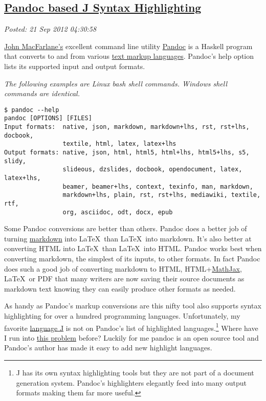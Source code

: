 %

\subsection*{\href{https://bakerjd99.wordpress.com/2012/09/20/pandoc-based-j-syntax-highlighting/}{Pandoc based J Syntax Highlighting}}

\noindent\emph{Posted: 21 Sep 2012 04:30:58}
\vspace{6pt}

\href{http://johnmacfarlane.net/}{John MacFarlane's} excellent command
line utility \href{http://johnmacfarlane.net/pandoc/}{Pandoc} is a Haskell program that converts to and from
various \href{http://en.wikipedia.org/wiki/Markup\_language}{text markup
languages}. Pandoc's help option lists its supported input and output
formats.

\emph{The following examples are Linux bash shell commands. Windows
shell commands are identical.}

\footnotesize
\begin{verbatim}
$ pandoc --help
pandoc [OPTIONS] [FILES]
Input formats:  native, json, markdown, markdown+lhs, rst, rst+lhs, docbook,
                textile, html, latex, latex+lhs
Output formats: native, json, html, html5, html+lhs, html5+lhs, s5, slidy,
                slideous, dzslides, docbook, opendocument, latex, latex+lhs,
                beamer, beamer+lhs, context, texinfo, man, markdown,
                markdown+lhs, plain, rst, rst+lhs, mediawiki, textile, rtf,
                org, asciidoc, odt, docx, epub
\end{verbatim}
\normalsize

Some Pandoc conversions are better than others. Pandoc does a better
job of turning \href{http://daringfireball.net/projects/markdown/syntax}{markdown} into
\LaTeX\ than \LaTeX\ into markdown. It's also better at converting HTML into
\LaTeX\ than \LaTeX\ into HTML. Pandoc works best when converting markdown,
the simplest of its inputs, to other formats. In fact Pandoc does such a
good job of converting markdown to HTML,
HTML+\href{http://www.mathjax.org/}{MathJax}, \LaTeX\ or PDF that many
writers are now saving their source documents as markdown text knowing
they can easily produce other formats as needed.

As handy as Pandoc's markup conversions are this nifty tool also
supports syntax highlighting for over a hundred programming languages.
Unfortunately, my favorite \href{http://www.jsoftware.com/}{language J}
is not on Pandoc's list of highlighted languages.\footnote{
J has its own syntax highlighting tools but they are not part of a
document generation system. Pandoc's highlighters elegantly feed into
many output formats making them far more useful.
} Where have I run 
into \href{http://bakerjd99.wordpress.com/2010/11/12/the-return-of-apl-fingers-2/}{this problem} before? Luckily for me pandoc is an open source tool and Pandoc's author has made it easy to add new highlight
languages.

